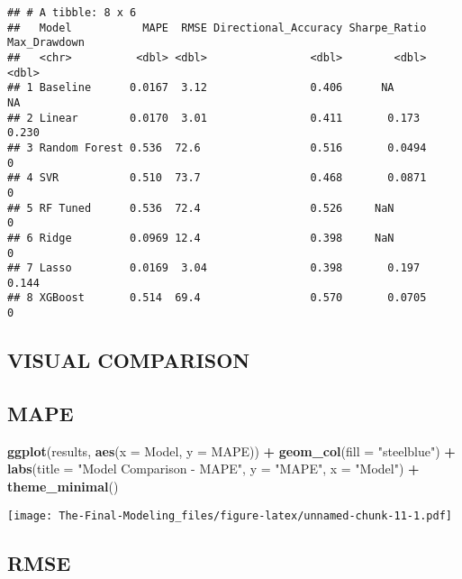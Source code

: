 \documentclass[
]{article}
\newenvironment{Shaded}{\begin{snugshade}}{\end{snugshade}}
\newcommand{\AttributeTok}[1]{\textcolor[rgb]{0.13,0.29,0.53}{#1}}
\newcommand{\FunctionTok}[1]{\textcolor[rgb]{0.13,0.29,0.53}{\textbf{#1}}}
\newcommand{\NormalTok}[1]{#1}
\newcommand{\SpecialCharTok}[1]{\textcolor[rgb]{0.81,0.36,0.00}{\textbf{#1}}}
\newcommand{\StringTok}[1]{\textcolor[rgb]{0.31,0.60,0.02}{#1}}
\begin{document}
\begin{verbatim}
## # A tibble: 8 x 6
##   Model           MAPE  RMSE Directional_Accuracy Sharpe_Ratio Max_Drawdown
##   <chr>          <dbl> <dbl>                <dbl>        <dbl>        <dbl>
## 1 Baseline      0.0167  3.12                0.406      NA            NA    
## 2 Linear        0.0170  3.01                0.411       0.173         0.230
## 3 Random Forest 0.536  72.6                 0.516       0.0494        0    
## 4 SVR           0.510  73.7                 0.468       0.0871        0    
## 5 RF Tuned      0.536  72.4                 0.526     NaN             0    
## 6 Ridge         0.0969 12.4                 0.398     NaN             0    
## 7 Lasso         0.0169  3.04                0.398       0.197         0.144
## 8 XGBoost       0.514  69.4                 0.570       0.0705        0
\end{verbatim}

\subsection{VISUAL COMPARISON}\label{visual-comparison}

\subsection{MAPE}\label{mape}

\begin{Shaded}
\begin{Highlighting}[]
\FunctionTok{ggplot}\NormalTok{(results, }\FunctionTok{aes}\NormalTok{(}\AttributeTok{x =}\NormalTok{ Model, }\AttributeTok{y =}\NormalTok{ MAPE)) }\SpecialCharTok{+}
  \FunctionTok{geom\_col}\NormalTok{(}\AttributeTok{fill =} \StringTok{"steelblue"}\NormalTok{) }\SpecialCharTok{+}
  \FunctionTok{labs}\NormalTok{(}\AttributeTok{title =} \StringTok{"Model Comparison {-} MAPE"}\NormalTok{, }\AttributeTok{y =} \StringTok{"MAPE"}\NormalTok{, }\AttributeTok{x =} \StringTok{"Model"}\NormalTok{) }\SpecialCharTok{+}
  \FunctionTok{theme\_minimal}\NormalTok{()}
\end{Highlighting}
\end{Shaded}

\texttt{[image: The-Final-Modeling\_files/figure-latex/unnamed-chunk-11-1.pdf]}

\subsection{RMSE}\label{rmse}
\end{document}
